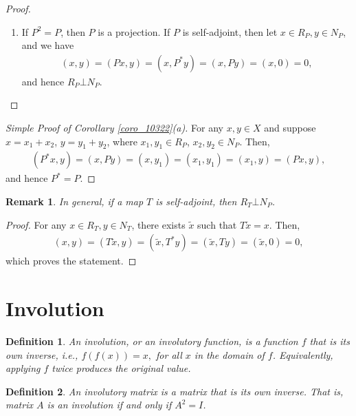 \documentclass[10pt]{book}
\newtheorem{definition}{Definition}[chapter]
\newtheorem{remark}{Remark}[chapter]
\theoremstyle{definition}
\numberwithin{equation}{chapter}
\begin{document}
\begin{subappendices}
\begin{proof}
\begin{enumerate}[label=(\alph*)]
    \item If $P^2 = P$, then $P$ is a projection. If $P$ is self-adjoint, then let $x \in R_P, y \in N_P$, and we have
    \begin{align*}
        (x, y) = (Px, y) = (x, P^*y) = (x, Py) = (x, 0) = 0,
    \end{align*}
    and hence $R_P \bot N_P$.
\end{enumerate}
\end{proof}

\medskip

\begin{proof}[Simple Proof of Corollary \ref{coro_10322}(a)]
For any $x, y \in X$ and suppose $x = x_1 + x_2$, $y = y_1 + y_2$, where $x_1, y_1 \in R_P$, $x_2, y_2 \in N_P$. Then,
\begin{align*}
    (P^*x,y) = (x,Py) = (x,y_1) = (x_1,y_1) = (x_1,y) = (Px,y),
\end{align*}
and hence $P^* = P$.
\end{proof}

\medskip

\begin{remark}
In general, if a map $T$ is self-adjoint, then $R_T \bot N_P$.
\end{remark}
\begin{proof}
For any $x \in R_T, y\in N_T$, there exists $\widetilde{x}$ such that $T\widetilde{x} = x$. Then,
\begin{align*}
    (x,y) = \left(T\widetilde{x},y\right) = \left(\widetilde{x},T^*y\right) = \left(\widetilde{x},Ty\right) = \left(\widetilde{x},0\right) = 0,
\end{align*}
which proves the statement.
\end{proof}

\medskip

\section{Involution}
\begin{definition}
An involution, or an involutory function, is a function $f$ that is its own inverse, i.e., $f(f(x)) = x,$ for all $x$ in the domain of $f$. Equivalently, applying $f$ twice produces the original value.
\end{definition}

\medskip

\begin{definition}
An involutory matrix is a matrix that is its own inverse. That is, matrix $A$ is an involution if and only if $A^2 = I$.
\end{definition}


\end{subappendices}
\end{document}
